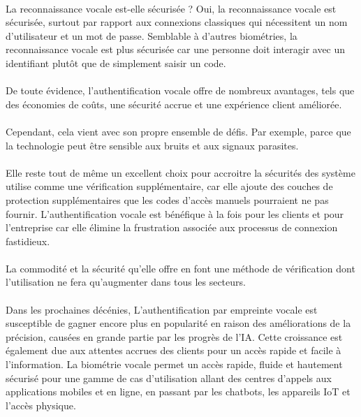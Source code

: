\paragraph{}La reconnaissance vocale est-elle sécurisée ? Oui, la reconnaissance vocale est sécurisée, surtout par rapport aux connexions classiques qui nécessitent un nom d'utilisateur et un mot de passe. Semblable à d'autres biométries, la reconnaissance vocale est plus sécurisée car une personne doit interagir avec un identifiant plutôt que de simplement saisir un code.
\paragraph{}De toute évidence, l'authentification vocale offre de nombreux avantages, tels que des économies de coûts, une sécurité accrue et une expérience client améliorée.
\paragraph{}Cependant, cela vient avec son propre ensemble de défis. Par exemple, parce que la technologie peut être sensible aux bruits et aux signaux parasites.
\paragraph{}Elle reste tout de même un  excellent choix pour accroitre la sécurités des système utilise comme une vérification supplémentaire, car elle ajoute des couches de protection supplémentaires que les codes d'accès manuels pourraient ne pas fournir. L'authentification vocale est bénéfique à la fois pour les clients et pour l'entreprise car elle élimine la frustration associée aux processus de connexion fastidieux.
\paragraph{}La commodité et la sécurité qu'elle offre en font une méthode de vérification dont l'utilisation ne fera qu'augmenter dans tous les secteurs.
\paragraph{}Dans les prochaines décénies, L'authentification par empreinte vocale est susceptible de gagner encore plus en popularité en raison des améliorations de la précision, causées en grande partie par les progrès de l'IA. Cette croissance est également due aux attentes accrues des clients pour un accès rapide et facile à l'information. La biométrie vocale permet un accès rapide, fluide et hautement sécurisé pour une gamme de cas d'utilisation allant des centres d'appels aux applications mobiles et en ligne, en passant par les chatbots, les appareils IoT et l'accès physique.

